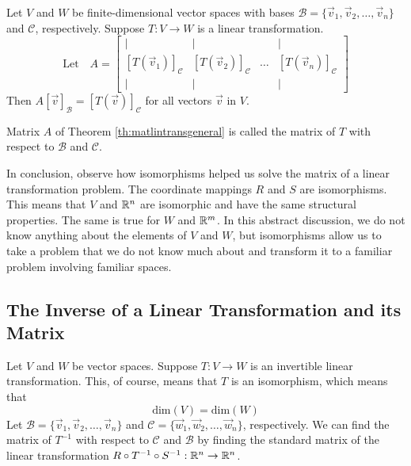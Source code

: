 \documentclass{ximera}
\begin{document}
\begin{theorem}\label{th:matlintransgeneral}
Let $V$ and $W$ be finite-dimensional vector spaces with bases $\mathcal{B}=\{\vec{v}_1,\vec{v}_2,\ldots,\vec{v}_n\}$ and $\mathcal{C}$, respectively.  Suppose $T:V\rightarrow W$ is a linear transformation.  
$$\text{Let}\quad A=\begin{bmatrix}
           | & |& &|\\
		[T(\vec{v}_1)]_{\mathcal{C}} & [T(\vec{v}_2)]_{\mathcal{C}}&\dots &[T(\vec{v}_n)]_{\mathcal{C}}\\
		|&| & &|
         \end{bmatrix}$$
Then $A[\vec{v}]_{\mathcal{B}}=[T(\vec{v})]_{\mathcal{C}}$ for all vectors $\vec{v}$ in $V$.       
\end{theorem}

\begin{definition}\label{def:matlintransgenera}
Matrix $A$ of Theorem \ref{th:matlintransgeneral} is called the matrix of $T$ with respect to $\mathcal{B}$ and $\mathcal{C}$.
\end{definition}

In conclusion, observe how isomorphisms helped us solve the matrix of a linear transformation problem.  The coordinate mappings $R$ and $S$ are isomorphisms.  This means that $V$ and $\mathbb{R}^n$ are isomorphic and have the same structural properties.  The same is true for $W$ and $\mathbb{R}^m$.  In this abstract discussion, we do not know anything about the elements of $V$ and $W$, but isomorphisms allow us to take a problem that we do not know much about and transform it to a familiar problem involving familiar spaces.

\subsection*{The Inverse of a Linear Transformation and its Matrix}

Let $V$ and $W$ be vector spaces.  Suppose $T:V\rightarrow W$ is an invertible linear transformation.  This, of course, means that $T$ is an isomorphism, which means that 
$$\mbox{dim}(V)=\mbox{dim}(W)$$
Let
$\mathcal{B}=\{\vec{v}_1, \vec{v}_2,\ldots ,\vec{v}_n\}$ and $\mathcal{C}=\{\vec{w}_1, \vec{w}_2,\ldots ,\vec{w}_n\}$, respectively.   We can find the matrix of $T^{-1}$ with respect to $\mathcal{C}$ and $\mathcal{B}$ by finding the standard matrix of the linear transformation $R\circ T^{-1}\circ S^{-1}:\mathbb{R}^n\rightarrow \mathbb{R}^n$.
\end{document}
